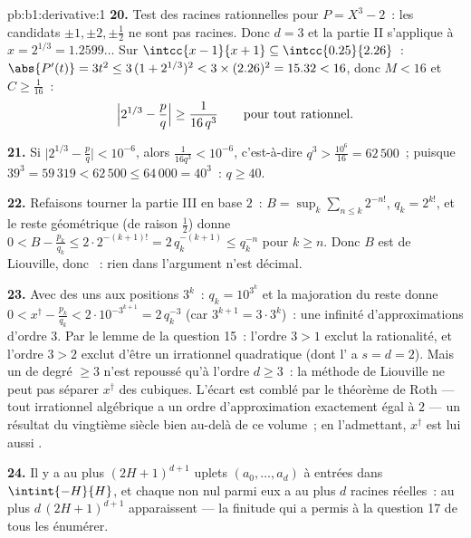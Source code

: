 \begin{solution}{pb:b1:derivative:1}
\textbf{20.} Test des racines rationnelles pour $P = X^3 - 2$~: les candidats
$\pm1, \pm2, \pm\frac12$ ne sont pas racines. Donc $d = 3$ et la partie II
s'applique à $x = 2^{1/3} = 1.2599\dots$ Sur $\intcc{x - 1}{x + 1}
\subseteq \intcc{0.25}{2.26}$~: $\abs{P'(t)} = 3t^2 \leq 3\,(1 +
2^{1/3})^2 < 3\times(2.26)^2 = 15.32 < 16$, donc $M < 16$ et $C
\geq \frac{1}{16}$~:
\[
\Bigl|2^{1/3} - \frac pq\Bigr| \geq \frac{1}{16\,q^3}
\qquad\text{pour tout rationnel.}
\]

\textbf{21.} Si $\bigl|2^{1/3} - \frac pq\bigr| < 10^{-6}$, alors
$\frac{1}{16 q^3} < 10^{-6}$, c'est-à-dire $q^3 > \frac{10^6}{16} =
62\,500$~; puisque $39^3 = 59\,319 < 62\,500 \leq 64\,000 = 40^3$~:
$q \geq 40$.

\textbf{22.} Refaisons tourner la partie III en base $2$~: $B = \sup_k \sum_{n\leq
k} 2^{-n!}$, $q_k = 2^{k!}$, et le reste géométrique (de raison
$\frac12$) donne $0 < B - \frac{p_k}{q_k} \leq 2\cdot2^{-(k+1)!}
= 2\,q_k^{-(k+1)} \leq q_k^{-n}$ pour $k \geq n$. Donc $B$ est de
Liouville, donc ~: rien dans l'argument n'est
décimal.

\textbf{23.} Avec des uns aux positions $3^k$~: $q_k = 10^{3^k}$ et
la majoration du reste donne $0 < x^\dagger - \frac{p_k}{q_k} <
2\cdot10^{-3^{k+1}} = 2\,q_k^{-3}$ (car $3^{k+1} = 3\cdot3^k$)~:
une infinité d'approximations d'ordre $3$. Par le lemme de la
question 15~: l'ordre $3 > 1$ exclut la rationalité, et l'ordre $3 >
2$ exclut d'être un irrationnel quadratique (dont l' a $s = d = 2$). Mais un  de degré
$\geq 3$ n'est repoussé qu'à l'ordre $d \geq 3$~: la méthode de
Liouville ne peut pas séparer $x^\dagger$ des cubiques. L'écart est
comblé par le théorème de Roth --- tout irrationnel algébrique a un
ordre d'approximation exactement égal à $2$ --- un résultat du vingtième siècle
bien au-delà de ce volume~; en l'admettant, $x^\dagger$ est lui aussi
.

\textbf{24.} Il y a au plus $(2H+1)^{d+1}$ uplets $(a_0,
\dots, a_d)$ à entrées dans $\intint{-H}{H}$, et chaque 
non nul parmi eux a au plus $d$ racines réelles~: au plus
$d\,(2H+1)^{d+1}$  apparaissent --- la finitude
qui a permis à la question 17 de tous les énumérer.


\end{solution}
